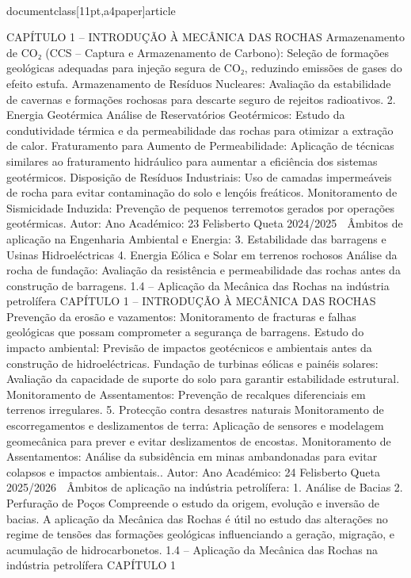 \\documentclass[11pt,a4paper]{article}
\begin{document}
CAPÍTULO 1 
–
 INTRODUÇÃO À MECÂNICA DAS ROCHAS
Armazenamento de CO₂ (CCS – Captura e Armazenamento de Carbono):
Seleção de formações geológicas adequadas para injeção segura de CO₂, reduzindo emissões de gases do efeito estufa.
Armazenamento de Resíduos Nucleares:
Avaliação da estabilidade de cavernas e formações rochosas para descarte seguro de rejeitos radioativos.
2. Energia Geotérmica
Análise de Reservatórios Geotérmicos:
Estudo da condutividade térmica e da permeabilidade das rochas para otimizar a extração de calor.
Fraturamento para Aumento de Permeabilidade:
Aplicação de técnicas similares ao fraturamento hidráulico para aumentar a eficiência dos sistemas geotérmicos.
Disposição de Resíduos Industriais:
Uso de camadas impermeáveis de rocha para evitar contaminação do solo e lençóis freáticos.
Monitoramento de Sismicidade Induzida:
Prevenção de pequenos terremotos gerados por operações geotérmicas.
Autor:
Ano Académico:
23
Felisberto Queta
2024/2025

 Âmbitos de aplicação 
na Engenharia Ambiental e Energia:
3. Estabilidade das barragens e Usinas Hidroeléctricas
4. Energia Eólica e Solar em terrenos rochosos
Análise da rocha de fundação:
Avaliação da resistência e permeabilidade das rochas antes da construção de barragens.
1.4 – Aplicação da Mecânica das Rochas na indústria petrolífera
CAPÍTULO 1 
–
 INTRODUÇÃO À MECÂNICA DAS ROCHAS
Prevenção da erosão e vazamentos:
Monitoramento de fracturas e falhas geológicas que possam comprometer a segurança de barragens.
Estudo do impacto ambiental:
Previsão de impactos geotécnicos e ambientais antes da construção de hidroeléctricas.
Fundação de turbinas eólicas e painéis solares:
Avaliação da capacidade de suporte do solo para garantir estabilidade estrutural.
Monitoramento de Assentamentos:
Prevenção de recalques diferenciais em terrenos irregulares.
5. Protecção contra desastres naturais
Monitoramento de escorregamentos e deslizamentos de terra:
Aplicação de sensores e modelagem geomecânica para prever e evitar deslizamentos de encostas.
Monitoramento de Assentamentos:
Análise da subsidência em minas ambandonadas para evitar colapsos e impactos ambientais..
Autor:
Ano Académico:
24
Felisberto Queta
2025/2026

 Âmbitos de aplicação na indústria petrolífera:
1. Análise de Bacias
2. Perfuração de Poços
Compreende o estudo da origem, evolução e inversão de bacias. A aplicação da Mecânica das Rochas é útil no estudo das
alterações no regime de tensões das formações geológicas influenciando a geração, migração, e acumulação de
hidrocarbonetos.
1.4 – Aplicação da Mecânica das Rochas na indústria petrolífera
CAPÍTULO 1 
\end{document}
